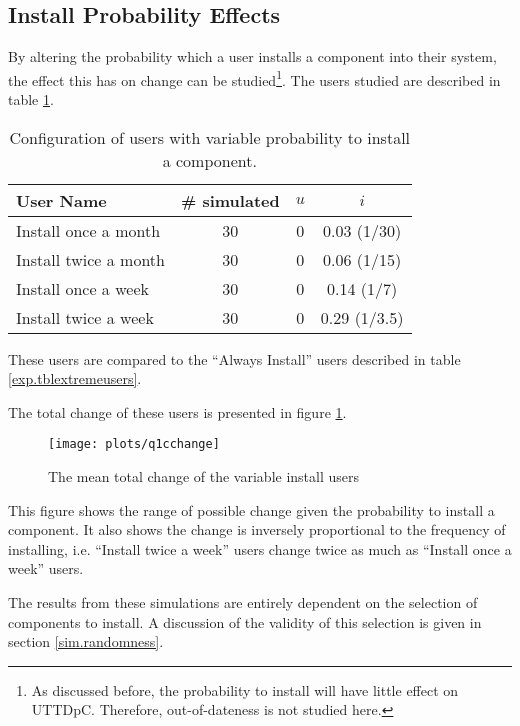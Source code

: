 \subsection{Install Probability Effects}
By altering the probability which a user installs a component into their system, the effect this has on 
change can be studied\footnote{As discussed before, the probability to install will have little effect on UTTDpC. Therefore, out-of-dateness is not studied here.}.
The users studied are described in table \ref{exp.tblq1cusers}.
\begin{table}[h!]
\centering
\begin{tabular}{|l | c | c | c |}
\hline
User Name 				& \# simulated 	& $u$ 		& $i$ 			\\ \hline
Install once a month	& 30 			& 0 & 0.03 (1/30)							 \\
Install twice a month	& 30 			& 0 & 0.06 (1/15)						\\
Install once a week		& 30 			& 0 & 0.14 (1/7)					 \\
Install twice a week 	& 30 			& 0 & 0.29 (1/3.5)						\\ \hline
\end{tabular}
\caption{Configuration of users with variable probability to install a component.}
\label{exp.tblq1cusers}
\end{table}
These users are compared to the ``Always Install'' users described in table \ref{exp.tblextremeusers}.

The total change of these users is presented in figure \ref{exp.q1cchange}.
\begin{figure}[htp]
\begin{center}
  \texttt{[image: plots/q1cchange]}
  \caption{The mean total change of the variable install users}
  \label{exp.q1cchange}
\end{center}
\end{figure}
This figure shows the range of possible change given the probability to install a component.
It also shows the change is inversely proportional to the frequency of installing, 
i.e. ``Install twice a week'' users change twice as much as ``Install once a week'' users.

The results from these simulations are entirely dependent on the selection of components to install.
A discussion of the validity of this selection is given in section \ref{sim.randomness}.

